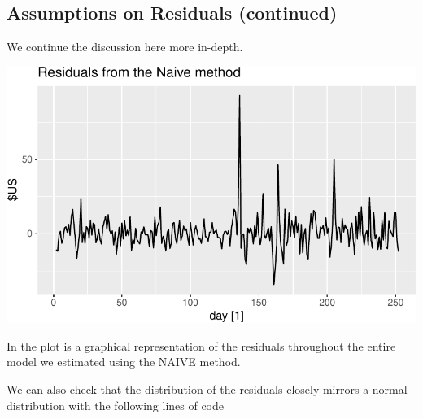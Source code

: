 \documentclass[
  letterpaper,
  DIV=11,
  numbers=noendperiod]{scrartcl}
\newenvironment{Shaded}{\begin{snugshade}}{\end{snugshade}}
\newcommand{\AttributeTok}[1]{\textcolor[rgb]{0.40,0.45,0.13}{#1}}
\newcommand{\FunctionTok}[1]{\textcolor[rgb]{0.28,0.35,0.67}{#1}}
\newcommand{\NormalTok}[1]{\textcolor[rgb]{0.00,0.23,0.31}{#1}}
\newcommand{\OtherTok}[1]{\textcolor[rgb]{0.00,0.23,0.31}{#1}}
\newcommand{\SpecialCharTok}[1]{\textcolor[rgb]{0.37,0.37,0.37}{#1}}
\newcommand{\StringTok}[1]{\textcolor[rgb]{0.13,0.47,0.30}{#1}}
\begin{document}
\subsection{Assumptions on Residuals
(continued)}\label{assumptions-on-residuals-continued}

We continue the discussion here more in-depth.

\begin{Shaded}
\end{Shaded}

\begin{center}
\includegraphics{chapter5_review_files/figure-pdf/unnamed-chunk-29-1.pdf}
\end{center}

In the plot is a graphical representation of the residuals throughout
the entire model we estimated using the NAIVE method.

We can also check that the distribution of the residuals closely mirrors
a normal distribution with the following lines of code
\end{document}
